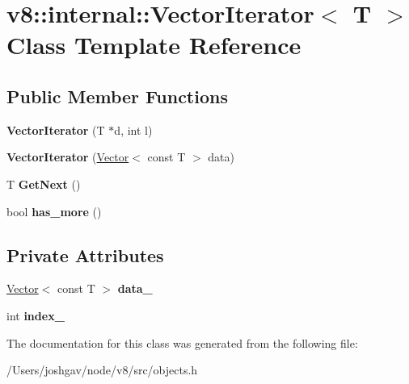 \hypertarget{classv8_1_1internal_1_1_vector_iterator}{}\section{v8\+:\+:internal\+:\+:Vector\+Iterator$<$ T $>$ Class Template Reference}
\label{classv8_1_1internal_1_1_vector_iterator}
\subsection*{Public Member Functions}
\begin{DoxyCompactItemize}
\item 
{\bfseries Vector\+Iterator} (T $\ast$d, int l)\hypertarget{classv8_1_1internal_1_1_vector_iterator_a5721bb81564089949c1cea330858f659}{}\label{classv8_1_1internal_1_1_vector_iterator_a5721bb81564089949c1cea330858f659}

\item 
{\bfseries Vector\+Iterator} (\hyperlink{classv8_1_1internal_1_1_vector}{Vector}$<$ const T $>$ data)\hypertarget{classv8_1_1internal_1_1_vector_iterator_a0dc4c9efcb9257f5f1f37c1e1af9aac8}{}\label{classv8_1_1internal_1_1_vector_iterator_a0dc4c9efcb9257f5f1f37c1e1af9aac8}

\item 
T {\bfseries Get\+Next} ()\hypertarget{classv8_1_1internal_1_1_vector_iterator_ac2c10a0c007bd377a35dc83553340a95}{}\label{classv8_1_1internal_1_1_vector_iterator_ac2c10a0c007bd377a35dc83553340a95}

\item 
bool {\bfseries has\+\_\+more} ()\hypertarget{classv8_1_1internal_1_1_vector_iterator_a4599ae0ce6acfde5beddcd9943f721b7}{}\label{classv8_1_1internal_1_1_vector_iterator_a4599ae0ce6acfde5beddcd9943f721b7}

\end{DoxyCompactItemize}
\subsection*{Private Attributes}
\begin{DoxyCompactItemize}
\item 
\hyperlink{classv8_1_1internal_1_1_vector}{Vector}$<$ const T $>$ {\bfseries data\+\_\+}\hypertarget{classv8_1_1internal_1_1_vector_iterator_a383dd6f6b48c30789bc2ae782b2753a1}{}\label{classv8_1_1internal_1_1_vector_iterator_a383dd6f6b48c30789bc2ae782b2753a1}

\item 
int {\bfseries index\+\_\+}\hypertarget{classv8_1_1internal_1_1_vector_iterator_abef16fd7157430319a3c6a3089db8297}{}\label{classv8_1_1internal_1_1_vector_iterator_abef16fd7157430319a3c6a3089db8297}

\end{DoxyCompactItemize}


The documentation for this class was generated from the following file\+:\begin{DoxyCompactItemize}
\item 
/\+Users/joshgav/node/v8/src/objects.\+h\end{DoxyCompactItemize}
